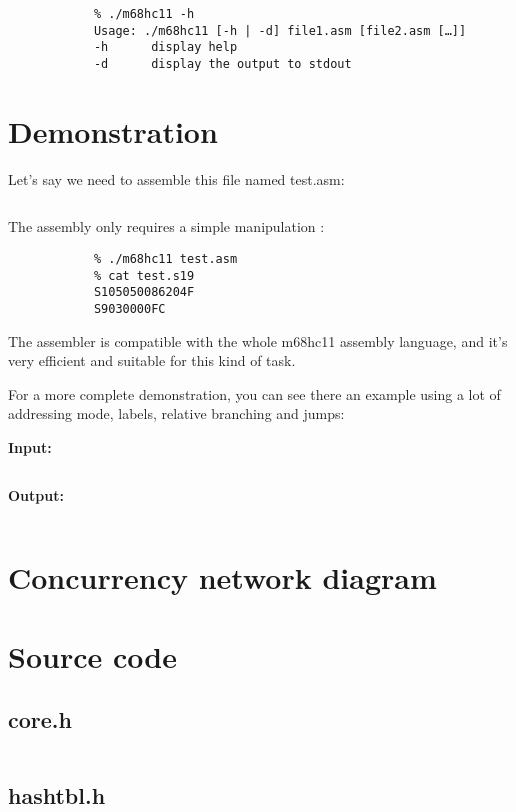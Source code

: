 \documentclass[a4paper,11pt]{article}
\begin{document}
        \begin{verbatim}
            % ./m68hc11 -h
            Usage: ./m68hc11 [-h | -d] file1.asm [file2.asm […]]
            -h      display help
            -d      display the output to stdout
        \end{verbatim}


    \section{Demonstration}
        
        Let's say we need to assemble this file named test.asm:

        \inputminted{nasm}{../../asm/test.asm}

        The assembly only requires a simple manipulation :

        \begin{verbatim}
            % ./m68hc11 test.asm
            % cat test.s19
            S105050086204F
            S9030000FC
        \end{verbatim}

        The assembler is compatible with the whole m68hc11 assembly language, 
        and it's very efficient and suitable for this kind of task.

        For a more complete demonstration, you can see there an example using a
        lot of addressing mode, labels, relative branching and jumps:

        \textbf{Input:}
        \inputminted{nasm}{../../asm/long.asm}

        \textbf{Output:}
        \inputminted{console}{../../asm/long.s19}

    \section{Concurrency network diagram}
        

    \newpage
    \section{Source code}
        \subsection{core.h}
            \inputminted{c}{../../src/core.h}
        \subsection{hashtbl.h}
            \inputminted{c}{../../src/hashtbl.h}
\end{document}
